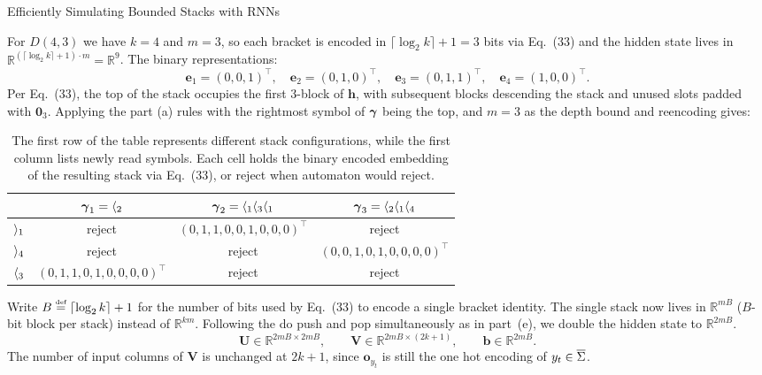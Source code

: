 \begin{question}{Efficiently Simulating Bounded Stacks with RNNs}
\begin{subquestion}
    For $D(4, 3)$ we have $k = 4$ and $m = 3$, so each bracket is encoded in $\lceil \log_2 k \rceil + 1 = 3$ bits via Eq.~(33) and the hidden state lives in $\mathbb{R}^{(\lceil \log_2 k \rceil + 1) \cdot m} = \mathbb{R}^{9}$. 
    The binary representations:
    \[
        \mathbf{e}_1 = (0, 0, 1)^\top, \quad \mathbf{e}_2 = (0, 1, 0)^\top, \quad \mathbf{e}_3 = (0, 1, 1)^\top, \quad \mathbf{e}_4 = (1, 0, 0)^\top.
    \]
    Per Eq.~(33), the top of the stack occupies the first $3$-block of $\mathbf{h}$, with subsequent blocks descending the stack and unused slots padded with $\mathbf{0}_3$. 
    Applying the part (a) rules with the rightmost symbol of $\stackseq$ being the top, and $m = 3$ as the depth bound and reencoding gives:
    \begin{table}[H]
    \centering
    \small
        \begin{tabular}{cccc}
            \toprule
            & $\stackseq_1 = \openBr{2}$ &
            $\stackseq_2 = \openBr{1}\openBr{3}\openBr{1}$ &
            $\stackseq_3 = \openBr{2}\openBr{1}\openBr{4}$ \\
            \midrule
            $\closeBr{1}$ & reject & $(0, 1, 1, 0, 0, 1, 0, 0, 0)^\top$ & reject \\
            $\closeBr{4}$ & reject & reject & $(0, 0, 1, 0, 1, 0, 0, 0, 0)^\top$ \\
            $\openBr{3}$ & $(0, 1, 1, 0, 1, 0, 0, 0, 0)^\top$ & reject & reject \\
            \bottomrule
        \end{tabular}
        \caption{The first row of the table represents different stack configurations, while the first column lists newly read symbols. Each cell holds the binary encoded embedding of the resulting stack via Eq.~(33), or reject when automaton would reject.}
        \label{tab:binstackembeddings}
    \end{table}
\end{subquestion}

\begin{subquestion}
    Write $B \mathrel{\stackrel{\textnormal{\tiny def}}{=}} \lceil \log_2 k \rceil + 1$ for the number of bits used by Eq.~(33) to encode a single bracket identity. 
    The single stack now lives in $\mathbb{R}^{mB}$ ($B$-bit block per stack) instead of $\mathbb{R}^{km}$. 
    Following the do push and pop simultaneously as in part~(e), we double the hidden state to $\mathbb{R}^{2mB}$.
    \[
        \mathbf{U} \in \mathbb{R}^{2mB \times 2mB},
        \qquad
        \mathbf{V} \in \mathbb{R}^{2mB \times (2k+1)},
        \qquad
        \mathbf{b} \in \mathbb{R}^{2mB}.
    \]
    The number of input columns of $\mathbf{V}$ is unchanged at $2k+1$, since $\mathbf{o}_{y_t}$ is still the one hot encoding of $y_t \in \overline{\alphabet}$.


\end{subquestion}
\end{question}
